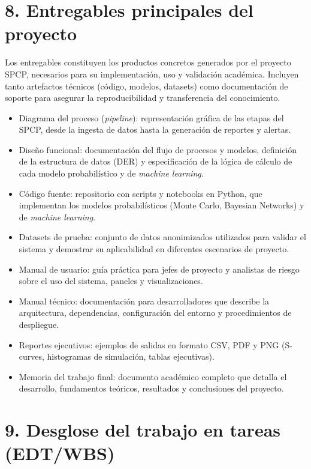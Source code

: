\documentclass[12pt]
{charter}
\begin{document}
\section{8. Entregables principales del proyecto}
\label{sec:entregables}

Los entregables constituyen los productos concretos generados por el proyecto SPCP, necesarios para su implementación, uso y validación académica. Incluyen tanto artefactos técnicos (código, modelos, datasets) como documentación de soporte para asegurar la reproducibilidad y transferencia del conocimiento.

\begin{itemize}
  \item Diagrama del proceso (\textit{pipeline}): representación gráfica de las etapas del SPCP, desde la ingesta de datos hasta la generación de reportes y alertas.
  \item Diseño funcional: documentación del flujo de procesos y modelos, definición de la estructura de datos (DER) y especificación de la lógica de cálculo de cada modelo probabilístico y de \textit{machine learning}.
  \item Código fuente: repositorio con scripts y notebooks en Python, que implementan los modelos probabilísticos (Monte Carlo, Bayesian Networks) y de \textit{machine learning}.
  \item Datasets de prueba: conjunto de datos anonimizados utilizados para validar el sistema y demostrar su aplicabilidad en diferentes escenarios de proyecto.
  \item Manual de usuario: guía práctica para jefes de proyecto y analistas de riesgo sobre el uso del sistema, paneles y visualizaciones.
  \item Manual técnico: documentación para desarrolladores que describe la arquitectura, dependencias, configuración del entorno y procedimientos de despliegue.
  \item Reportes ejecutivos: ejemplos de salidas en formato CSV, PDF y PNG (S-curves, histogramas de simulación, tablas ejecutivas).
  \item Memoria del trabajo final: documento académico completo que detalla el desarrollo, fundamentos teóricos, resultados y conclusiones del proyecto.
\end{itemize}


\section{9. Desglose del trabajo en tareas (EDT/WBS)}
\label{sec:wbs}
\end{document}
